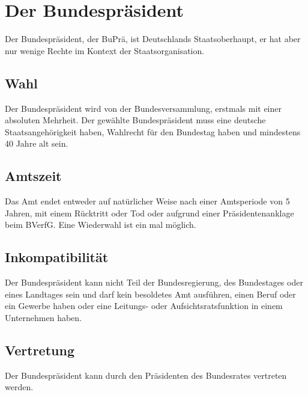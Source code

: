 \documentclass{article}
\begin{document}
\section{Der Bundespräsident} 
Der Bundespräsident, der BuPrä, ist Deutschlands Staatsoberhaupt, er hat aber nur wenige Rechte im Kontext der Staatsorganisation.  \GG
{}

\subsection{Wahl}
Der Bundespräsident wird von der Bundesversammlung, erstmals mit einer absoluten Mehrheit. Der gewählte Bundespräsident muss eine deutsche Staatsangehörigkeit haben, Wahlrecht für den Bundestag haben und mindestens 40 Jahre alt sein.

\subsection{Amtszeit}
Das Amt endet entweder auf natürlicher Weise nach einer Amtsperiode von 5 Jahren, mit einem Rücktritt oder Tod oder aufgrund einer Präsidentenanklage beim BVerfG. Eine Wiederwahl ist ein mal möglich.

\subsection{Inkompatibilität}
Der Bundespräsident kann nicht Teil der Bundesregierung, des Bundestages oder eines Landtages sein und darf kein besoldetes Amt ausführen, einen Beruf oder ein Gewerbe haben oder eine Leitungs- oder Aufsichtsratsfunktion in einem Unternehmen haben.

\subsection{Vertretung}
Der Bundespräsident kann durch den Präsidenten des Bundesrates vertreten werden.
\end{document}
